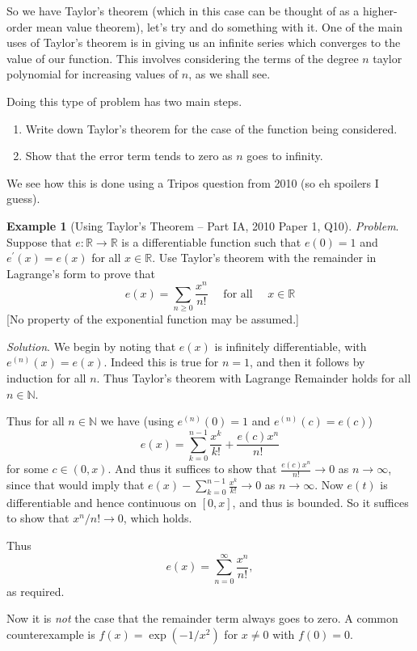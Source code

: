 \documentclass[11pt, a4paper]{article}
\theoremstyle{definition}
\newtheorem{example}[theorem]{Example}
\newcommand{\N}{\mathbb{N}}
\begin{document}
So we have Taylor's theorem (which in this case can be thought of as a higher-order mean value theorem), let's try and do something with it. One of the main uses of Taylor's theorem is in giving us an infinite series which converges to the value of our function. This involves considering the terms of the degree $n$ taylor polynomial for increasing values of $n$, as we shall see.

Doing this type of problem has two main steps.
\begin{enumerate}
	\item Write down Taylor's theorem for the case of the function being considered.
	\item Show that the error term tends to zero as $n$ goes to infinity.
\end{enumerate}
We see how this is done using a Tripos question from 2010 (so eh spoilers I guess).

\begin{example}[Using Taylor's Theorem -- Part IA, 2010 Paper 1, Q10]
\emph{Problem}. Suppose that $e: \mathbb{R} \rightarrow \mathbb{R}$ is a differentiable function such that $e(0)=1$ and $e^{\prime}(x)=e(x)$ for all $x \in \mathbb{R}$. Use Taylor's theorem with the remainder in Lagrange's form to prove that
$$
e(x)=\sum_{n \geqslant 0} \frac{x^{n}}{n !} \quad \text { for all } \quad x \in \mathbb{R}
$$
[No property of the exponential function may be assumed.]

\emph{Solution}. We begin by noting that $e(x)$ is infinitely differentiable, with $e^{(n)}(x) = e(x)$. Indeed this is true for $n = 1$, and then it follows by induction for all $n$. Thus Taylor's theorem with Lagrange Remainder holds for all $n \in \N$.

Thus for all $n \in \N$ we have (using $e^{(n)}(0) = 1$ and $e^{(n)}(c) = e(c)$)
$$
e(x) = \sum_{k = 0}^{n - 1}\frac{x^k}{k!} + \frac{e(c) x^n}{n!} 
$$
for some $c \in (0, x)$.
And thus it suffices to show that $\frac{e(c)x^n}{n!} \rightarrow 0$ as $n \rightarrow \infty$, since that would imply that $e(x) - \sum_{k = 0}^{n - 1} \frac{x^k}{k!} \rightarrow 0$ as $n \rightarrow \infty$.
Now $e(t)$ is differentiable and hence continuous on $[0, x]$, and thus is bounded. So it suffices to show that $x^n/n! \rightarrow 0$, which holds.

Thus
$$
e(x) = \sum_{n = 0}^{\infty} \frac{x^n}{n!},
$$
as required.
\end{example}


Now it is \emph{not} the case that the remainder term always goes to zero. A common counterexample is $f(x) = \exp(-1/x^2)$ for $x \neq 0$ with $f(0) = 0$.
\end{document}
